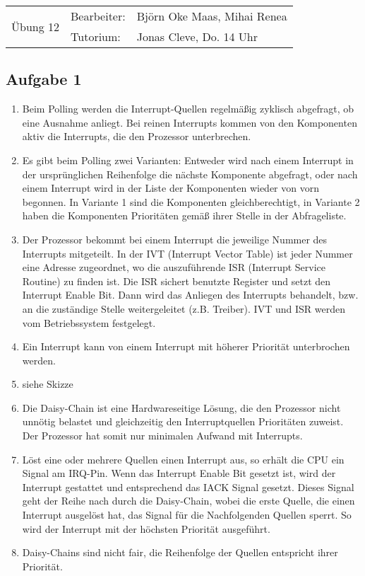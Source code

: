 \documentclass[paper=a4, english, ngerman]{scrartcl}
\begin{document}
	\begin{tabular}{p{8.5cm}ll}
		\multirow{2}{*}{\Huge{Übung 12} } & Bearbeiter: & Björn Oke Maas, Mihai Renea \\
		                                    & Tutorium:   & Jonas Cleve, Do. 14 Uhr     \\ \hline
	\end{tabular}
	
	\subsection*{Aufgabe 1}
\begin{enumerate}
	
	\item Beim Polling werden die Interrupt-Quellen regelmäßig zyklisch abgefragt, ob eine Ausnahme anliegt. Bei reinen Interrupts kommen von den Komponenten aktiv die Interrupts, die den Prozessor unterbrechen.
	
	\item Es gibt beim Polling zwei Varianten: Entweder wird nach einem Interrupt in der ursprünglichen Reihenfolge die nächste Komponente abgefragt, oder nach einem Interrupt wird in der Liste der Komponenten wieder von vorn begonnen. In Variante 1 sind die Komponenten gleichberechtigt, in Variante 2 haben die Komponenten Prioritäten gemäß ihrer Stelle in der Abfrageliste.
	
	\item Der Prozessor bekommt bei einem Interrupt die jeweilige Nummer des Interrupts mitgeteilt. In der IVT (Interrupt Vector Table) ist jeder Nummer eine Adresse zugeordnet, wo die auszuführende ISR (Interrupt Service Routine) zu finden ist. Die ISR sichert benutzte Register und setzt den Interrupt Enable Bit. Dann wird das Anliegen des Interrupts behandelt, bzw. an die zuständige Stelle weitergeleitet (z.B. Treiber). IVT und ISR werden vom Betriebssystem festgelegt.
	
	\item Ein Interrupt kann von einem Interrupt mit höherer Priorität unterbrochen werden.
	
	\item siehe Skizze
	
	\item Die Daisy-Chain ist eine Hardwareseitige Lösung, die den Prozessor nicht unnötig belastet und gleichzeitig den Interruptquellen Prioritäten zuweist. Der Prozessor hat somit nur minimalen Aufwand mit Interrupts.
	
	\item Löst eine oder mehrere Quellen einen Interrupt aus, so erhält die CPU ein Signal am IRQ-Pin. Wenn das Interrupt Enable Bit gesetzt ist, wird der Interrupt gestattet und entsprechend das IACK Signal gesetzt. Dieses Signal geht der Reihe nach durch die Daisy-Chain, wobei die erste Quelle, die einen Interrupt ausgelöst hat, das Signal für die Nachfolgenden Quellen sperrt. So wird der Interrupt mit der höchsten Priorität ausgeführt.
	
	\item Daisy-Chains sind nicht fair, die Reihenfolge der Quellen entspricht ihrer Priorität.
\end{enumerate}
\end{document}
